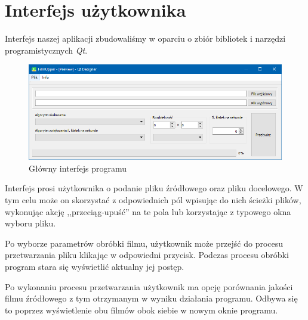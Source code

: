 \documentclass[twoside]{projektInzynierskiMS}
\begin{document}
\section{Interfejs użytkownika}
Interfejs naszej aplikacji zbudowaliśmy w oparciu o zbiór bibliotek i narzędzi programistycznych \emph{Qt}.
\begin{figure}[h]
\centering
\includegraphics[width=13cm]{uimain.png}
\caption{Główny interfejs programu}
\end{figure}
Interfejs prosi użytkownika o podanie pliku źródłowego oraz pliku docelowego. W tym celu może on skorzystać z odpowiednich pól wpisując do nich ścieżki plików, wykonując akcję ,,przeciąg-upuść'' na te pola lub  korzystając z typowego okna wyboru pliku.
\begin{figure}
\end{figure}
Po wyborze parametrów obróbki filmu, użytkownik może przejść do procesu przetwarzania pliku klikając w odpowiedni przycisk. Podczas procesu obróbki program stara się wyświetlić aktualny jej postęp.

Po wykonaniu procesu przetwarzania użytkownik ma opcję porównania jakości filmu źródłowego z tym otrzymanym w wyniku działania programu. Odbywa się to poprzez wyświetlenie obu filmów obok siebie w nowym oknie programu.
\begin{figure}
\end{figure}
\end{document}
